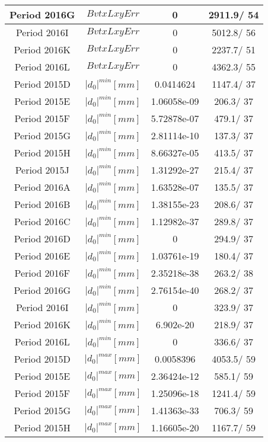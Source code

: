 \documentclass{article}
\begin{document}
\begin{longtable}{c|c|c|c}
\hline
 Period 2016G & $BvtxLxyErr$ & 0 & 2911.9/ 54\\
\hline
 Period 2016I & $BvtxLxyErr$ & 0 & 5012.8/ 56\\
\hline
 Period 2016K & $BvtxLxyErr$ & 0 & 2237.7/ 51\\
\hline
 Period 2016L & $BvtxLxyErr$ & 0 & 4362.3/ 55\\
\hline
 Period 2015D & $|d_{0}|^{min} [mm]$ & 0.0414624 & 1147.4/ 37\\
\hline
 Period 2015E & $|d_{0}|^{min} [mm]$ & 1.06058e-09 & 206.3/ 37\\
\hline
 Period 2015F & $|d_{0}|^{min} [mm]$ & 5.72878e-07 & 479.1/ 37\\
\hline
 Period 2015G & $|d_{0}|^{min} [mm]$ & 2.81114e-10 & 137.3/ 37\\
\hline
 Period 2015H & $|d_{0}|^{min} [mm]$ & 8.66327e-05 & 413.5/ 37\\
\hline
 Period 2015J & $|d_{0}|^{min} [mm]$ & 1.31292e-27 & 215.4/ 37\\
\hline
 Period 2016A & $|d_{0}|^{min} [mm]$ & 1.63528e-07 & 135.5/ 37\\
\hline
 Period 2016B & $|d_{0}|^{min} [mm]$ & 1.38155e-23 & 208.6/ 37\\
\hline
 Period 2016C & $|d_{0}|^{min} [mm]$ & 1.12982e-37 & 289.8/ 37\\
\hline
 Period 2016D & $|d_{0}|^{min} [mm]$ & 0 & 294.9/ 37\\
\hline
 Period 2016E & $|d_{0}|^{min} [mm]$ & 1.03761e-19 & 180.4/ 37\\
\hline
 Period 2016F & $|d_{0}|^{min} [mm]$ & 2.35218e-38 & 263.2/ 38\\
\hline
 Period 2016G & $|d_{0}|^{min} [mm]$ & 2.76154e-40 & 268.2/ 37\\
\hline
 Period 2016I & $|d_{0}|^{min} [mm]$ & 0 & 323.9/ 37\\
\hline
 Period 2016K & $|d_{0}|^{min} [mm]$ & 6.902e-20 & 218.9/ 37\\
\hline
 Period 2016L & $|d_{0}|^{min} [mm]$ & 0 & 336.6/ 37\\
\hline
 Period 2015D & $|d_{0}|^{max} [mm]$ & 0.0058396 & 4053.5/ 59\\
\hline
 Period 2015E & $|d_{0}|^{max} [mm]$ & 2.36424e-12 & 585.1/ 59\\
\hline
 Period 2015F & $|d_{0}|^{max} [mm]$ & 1.25096e-18 & 1241.4/ 59\\
\hline
 Period 2015G & $|d_{0}|^{max} [mm]$ & 1.41363e-33 & 706.3/ 59\\
\hline
 Period 2015H & $|d_{0}|^{max} [mm]$ & 1.16605e-20 & 1167.7/ 59\\

\end{longtable}
\end{document}
